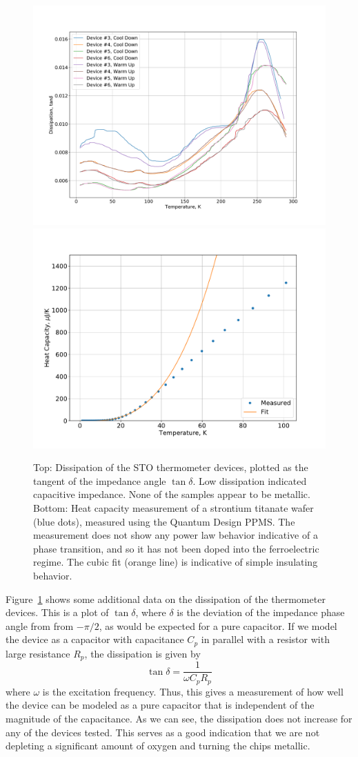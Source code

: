 \documentclass{thesis-umich}
\begin{document}
\begin{figure} \caption[Annealed STO Heat Capacity]{Top: Dissipation of the STO thermometer devices, plotted as the tangent of the impedance angle $\tan \delta$. Low dissipation indicated capacitive impedance. None of the samples appear to be metallic. Bottom: Heat capacity measurement of a strontium titanate wafer
(blue dots), measured using the Quantum Design PPMS. The measurement does not
show any power law behavior indicative of a phase transition, and so it has not
been doped into the ferroelectric regime. The cubic fit (orange line) is
indicative of simple insulating behavior.}
\label{fig:annealed_sto_repro_2}
\centering
\includegraphics[width=0.8\columnwidth]{figures/annealed_sto_diss_vs_t.pdf}
\includegraphics[width=0.8\columnwidth]{figures/annealed_sto_heatcap_vs_t.pdf}
\end{figure}

Figure~\ref{fig:annealed_sto_repro_2} shows some additional data on the dissipation of the thermometer devices. This is a plot of $\tan \delta$, where $\delta$ is the deviation of the impedance phase angle from from $-\pi/2$, as would be expected for a pure capacitor. If we model the device as a capacitor with capacitance $C_p$ in parallel with a resistor with large resistance $R_p$, the dissipation is given by~\cite{AHManual}
\[\tan \delta = \frac{1}{\omega C_p R_p}\] 
where $\omega$ is the excitation frequency. Thus, this gives a measurement of how well the device can be modeled as a pure capacitor that is independent of the magnitude of the capacitance. As we can see, the dissipation does not increase for any of the devices tested. This serves as a good indication that we are not depleting a significant amount of oxygen and turning the chips metallic.
\end{document}
